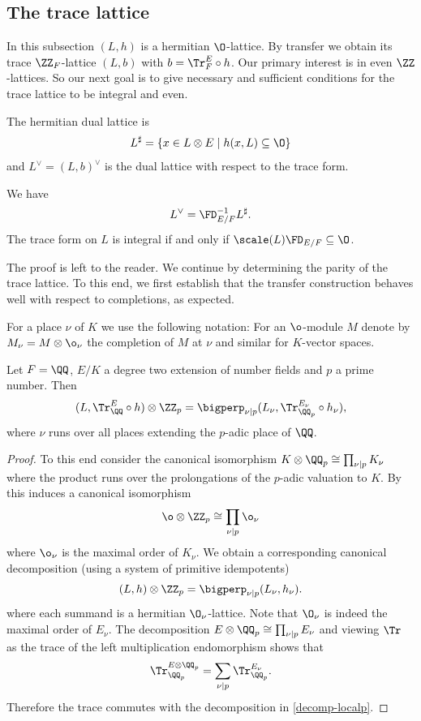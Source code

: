\subsection{The trace lattice}
In this subsection $(L,h)$ is a hermitian $\O$-lattice. By transfer we obtain its trace $\ZZ_F$-lattice $(L,b)$ with $b = \Tr^E_{F} \circ h$.
Our primary interest is in even $\ZZ$-lattices. So our next goal is to give necessary and sufficient conditions for the trace lattice to be integral and even.


The hermitian dual lattice is
\[L^\sharp = \{x \in L \otimes E \mid h(x,L) \subseteq \O\}\]
and $L^\vee = (L,b)^\vee$ is the dual lattice with respect to the trace form.

\begin{proposition}\label{trace-integral}
We have
\[L^\vee = {\FD_{E/F}^{-1}} L^\sharp.\]
The trace form on $L$ is integral if and only if $\scale(L) {\FD_{E/F}} \subseteq \O$.
\end{proposition}
The proof is left to the reader.
We continue by determining the parity of the trace lattice.
To this end,
we first establish that the transfer construction behaves well with respect to completions, as expected.

For a place $\nu$ of $K$ we use the following notation:
For an $\o$-module $M$ denote by $M_\nu = M \otimes \o_\nu$ the completion of $M$ at $\nu$ and similar for $K$-vector spaces.


\begin{proposition}\label{prop:tracedecompose}
  Let $F = \QQ$, $E/K$ a degree two extension of number fields and $p$ a prime number.
  Then
  \begin{equation}\label{decomp-local}
    (L,\Tr^E_\QQ \circ h) \otimes \ZZ_p = \bigperp_{\nu \mid p} (L_\nu, \Tr^{E_\nu}_{\QQ_p} \circ h_\nu),
  \end{equation}
  where $\nu$ runs over all places extending the $p$-adic place of $\QQ$.
\end{proposition}
\begin{proof}
To this end consider the canonical isomorphism $K \otimes \QQ_p \cong \prod_{\nu \mid p} K_\nu$ where the product runs over the prolongations of the $p$-adic valuation to $K$.
By \cite[Chap. II, \S3, Prop. 4]{Serre1979} this induces a canonical isomorphism
\[\o \otimes \ZZ_p \cong \prod_{\nu \mid p} \o_\nu\]
where $\o_\nu$ is the maximal order of $K_\nu$.
We obtain a corresponding canonical decomposition (using a system of primitive idempotents)
\begin{equation}\label{decomp-localp}
(L,h) \otimes \ZZ_p = \bigperp_{\nu \mid p} (L_\nu,h_\nu).
\end{equation}
  where each summand is a hermitian $\O_\nu$-lattice.
  Note that $\O_\nu$ is indeed the maximal order of $E_\nu$.
The decomposition $E \otimes \QQ_p \cong \prod_{\nu \mid p} E_\nu$
and viewing $\Tr$ as the trace of the left multiplication endomorphism shows that
\[\Tr^{E \otimes \QQ_p}_{\QQ_p}= \sum_{\nu \mid p} \Tr^{E_\nu}_{\QQ_p}.\]
Therefore the trace commutes with the decomposition in \cref{decomp-localp}.
\end{proof}


